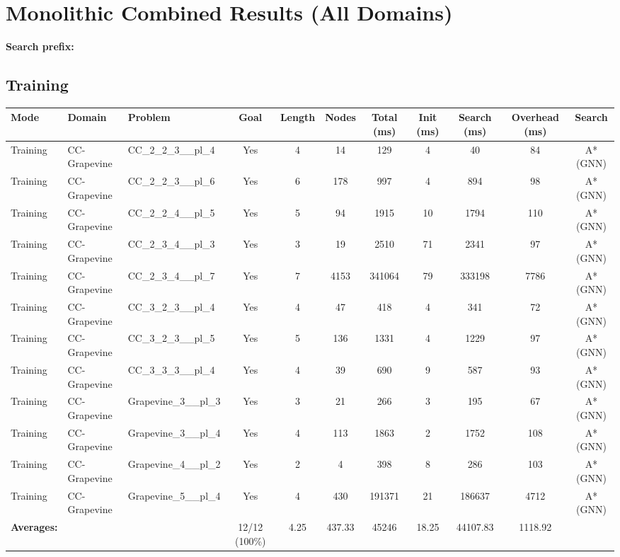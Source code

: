 \documentclass{article}
\begin{document}
\section*{Monolithic Combined Results (All Domains)}
\textbf{Search prefix:} 
\\[0.5cm]
\subsection*{Training}
\begin{tabular}{lllcccccccc}
\toprule
Mode & Domain & Problem & Goal & Length & Nodes & Total (ms) & Init (ms) & Search (ms) & Overhead (ms) & Search \\
\midrule
Training & CC-Grapevine & CC\_2\_2\_3\_\_pl\_4 & Yes & 4 & 14 & 129 & 4 & 40 & 84 & A*(GNN) \\
Training & CC-Grapevine & CC\_2\_2\_3\_\_pl\_6 & Yes & 6 & 178 & 997 & 4 & 894 & 98 & A*(GNN) \\
Training & CC-Grapevine & CC\_2\_2\_4\_\_pl\_5 & Yes & 5 & 94 & 1915 & 10 & 1794 & 110 & A*(GNN) \\
Training & CC-Grapevine & CC\_2\_3\_4\_\_pl\_3 & Yes & 3 & 19 & 2510 & 71 & 2341 & 97 & A*(GNN) \\
Training & CC-Grapevine & CC\_2\_3\_4\_\_pl\_7 & Yes & 7 & 4153 & 341064 & 79 & 333198 & 7786 & A*(GNN) \\
Training & CC-Grapevine & CC\_3\_2\_3\_\_pl\_4 & Yes & 4 & 47 & 418 & 4 & 341 & 72 & A*(GNN) \\
Training & CC-Grapevine & CC\_3\_2\_3\_\_pl\_5 & Yes & 5 & 136 & 1331 & 4 & 1229 & 97 & A*(GNN) \\
Training & CC-Grapevine & CC\_3\_3\_3\_\_pl\_4 & Yes & 4 & 39 & 690 & 9 & 587 & 93 & A*(GNN) \\
Training & CC-Grapevine & Grapevine\_3\_\_pl\_3 & Yes & 3 & 21 & 266 & 3 & 195 & 67 & A*(GNN) \\
Training & CC-Grapevine & Grapevine\_3\_\_pl\_4 & Yes & 4 & 113 & 1863 & 2 & 1752 & 108 & A*(GNN) \\
Training & CC-Grapevine & Grapevine\_4\_\_pl\_2 & Yes & 2 & 4 & 398 & 8 & 286 & 103 & A*(GNN) \\
Training & CC-Grapevine & Grapevine\_5\_\_pl\_4 & Yes & 4 & 430 & 191371 & 21 & 186637 & 4712 & A*(GNN) \\
\textbf{Averages:} & & & 12/12 (100\%) & 4.25 & 437.33 & 45246 & 18.25 & 44107.83 & 1118.92 & \\
\bottomrule
\end{tabular}
\newpage
\end{document}
